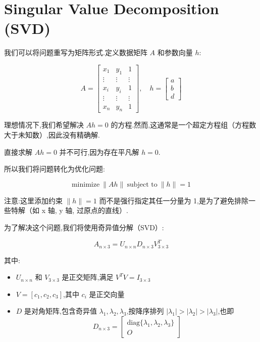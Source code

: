 \section{Singular Value Decomposition (SVD)}

我们可以将问题重写为矩阵形式.定义数据矩阵 $A$ 和参数向量 $h$:

$$
A = \begin{bmatrix}
x_1 & y_1 & 1 \\
\vdots & \vdots & \vdots \\
x_i & y_i & 1 \\
\vdots & \vdots & \vdots \\
x_n & y_n & 1
\end{bmatrix}, \quad
h = \begin{bmatrix}
a \\
b \\
d
\end{bmatrix}
$$

理想情况下,我们希望解决 $Ah = 0$ 的方程.然而,这通常是一个超定方程组（方程数大于未知数）,因此没有精确解.

直接求解 $Ah = 0$ 并不可行,因为存在平凡解 $h = 0$.

所以我们将问题转化为优化问题:

\begin{equation}
    \text{minimize} \: \|Ah\| \: \text{subject to} \: \|h\| = 1
\end{equation}

注意:这里添加约束 $\|h\| = 1$ 而不是强行指定其任一分量为 1,是为了避免排除一些特解（如 x 轴, y 轴, 过原点的直线）.

为了解决这个问题,我们将使用奇异值分解（SVD）:

$$
A_{n \times 3} = U_{n \times n} D_{n \times 3} V^T_{3 \times 3}
$$

其中:

\begin{itemize}
    \item $U_{n \times n}$ 和 $V_{3 \times 3}$ 是正交矩阵,满足 $V^T V = I_{3 \times 3}$
    \item $V = [c_1, c_2, c_3]$,其中 $c_i$ 是正交向量
    \item $D$ 是对角矩阵,包含奇异值 $\lambda_1, \lambda_2, \lambda_3$,按降序排列 $|\lambda_1| > |\lambda_2| > |\lambda_3|$,也即
    $$
    D_{n \times 3} = \begin{bmatrix}
    \text{diag}\{\lambda_1, \lambda_2, \lambda_3\} \\
    O
    \end{bmatrix}
    $$
\end{itemize}


